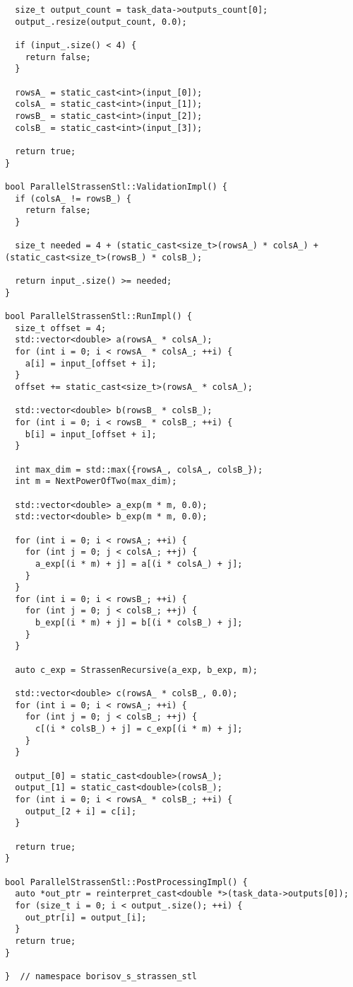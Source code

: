 \documentclass[12pt]{article}
\begin{document}
\begin{lstlisting}
  size_t output_count = task_data->outputs_count[0];
  output_.resize(output_count, 0.0);

  if (input_.size() < 4) {
    return false;
  }

  rowsA_ = static_cast<int>(input_[0]);
  colsA_ = static_cast<int>(input_[1]);
  rowsB_ = static_cast<int>(input_[2]);
  colsB_ = static_cast<int>(input_[3]);

  return true;
}

bool ParallelStrassenStl::ValidationImpl() {
  if (colsA_ != rowsB_) {
    return false;
  }

  size_t needed = 4 + (static_cast<size_t>(rowsA_) * colsA_) + (static_cast<size_t>(rowsB_) * colsB_);

  return input_.size() >= needed;
}

bool ParallelStrassenStl::RunImpl() {
  size_t offset = 4;
  std::vector<double> a(rowsA_ * colsA_);
  for (int i = 0; i < rowsA_ * colsA_; ++i) {
    a[i] = input_[offset + i];
  }
  offset += static_cast<size_t>(rowsA_ * colsA_);

  std::vector<double> b(rowsB_ * colsB_);
  for (int i = 0; i < rowsB_ * colsB_; ++i) {
    b[i] = input_[offset + i];
  }

  int max_dim = std::max({rowsA_, colsA_, colsB_});
  int m = NextPowerOfTwo(max_dim);

  std::vector<double> a_exp(m * m, 0.0);
  std::vector<double> b_exp(m * m, 0.0);

  for (int i = 0; i < rowsA_; ++i) {
    for (int j = 0; j < colsA_; ++j) {
      a_exp[(i * m) + j] = a[(i * colsA_) + j];
    }
  }
  for (int i = 0; i < rowsB_; ++i) {
    for (int j = 0; j < colsB_; ++j) {
      b_exp[(i * m) + j] = b[(i * colsB_) + j];
    }
  }

  auto c_exp = StrassenRecursive(a_exp, b_exp, m);

  std::vector<double> c(rowsA_ * colsB_, 0.0);
  for (int i = 0; i < rowsA_; ++i) {
    for (int j = 0; j < colsB_; ++j) {
      c[(i * colsB_) + j] = c_exp[(i * m) + j];
    }
  }

  output_[0] = static_cast<double>(rowsA_);
  output_[1] = static_cast<double>(colsB_);
  for (int i = 0; i < rowsA_ * colsB_; ++i) {
    output_[2 + i] = c[i];
  }

  return true;
}

bool ParallelStrassenStl::PostProcessingImpl() {
  auto *out_ptr = reinterpret_cast<double *>(task_data->outputs[0]);
  for (size_t i = 0; i < output_.size(); ++i) {
    out_ptr[i] = output_[i];
  }
  return true;
}

}  // namespace borisov_s_strassen_stl
\end{lstlisting}
\end{document}
